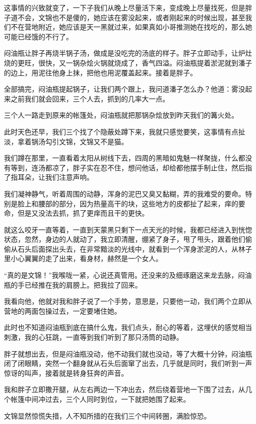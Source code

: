 这事情的兴致就变了，一下子我们从晚上尽量活下来，变成晚上尽量找死，但是胖子道不会，文锦也不是傻的，她应该在雾没起来，或者刚起来的时候出现，甚至我们不在营地附近，她应该是天一黑就过来，如果真如小哥推测她在找吃的，那么她可能已经饿的不行了。

闷油瓶让胖子再烧半锅子汤，做成是没吃完的汤底的样子。胖子立即动手，让炉灶烧的更旺，很快，又一锅杂烩火锅就烧成了，香气四溢。闷油瓶提着淤泥就到潘子的边上，用泥往他身上抹，把他也用泥覆盖起来。接着是胖子。

全部搞完，闷油瓶提起锅子，让我们两个跟上，我问道潘子怎么办？他道：雾没起来之前我们就会回来，三个人去，抓到的几率大一点。

三个人一路走到原来的帐篷处，闷油瓶就把那锅杂烩放到昨天我们的篝火处。

此时天色还早，我们三个找了个隐蔽处蹲下来，我就只感觉要笑，这事情有点扯淡，拿着锅汤勾引文锦，文锦又不是猫。

我们蹲在那里，一直看着太阳从树线下去，四周的黑暗如鬼魅一样聚拢，什么都没有等到，连汤都凉了，胖子实在忍不住，想问他话，却给都他摆手制止住，然后指了指耳朵，让我们注意声响。

我们凝神静气，听着周围的动静，浑身的泥巴又臭又黏糊，弄的我难受的要命。特别是脸上和腰部的部分，因为热量高干的块，这些地方的皮都扯了起来，痒的要命，但是又没法去抓，抓了更痒而且干的更快。

就这么咬牙一直等着，一直到天蒙黑只剩下一点天光的时候，我都已经进入到恍惚状态，忽然，身边的人就动了，我立即清醒，绷紧了身子，甩了甩头，跟着他们偷偷从石头后面探出头去，在非常黯淡的光线中，就看到一个浑身淤泥的人，从林子里小心翼翼的走了出来，看身材，赫然是一个女人。

“真的是文锦！”我喉咙一紧，心说还真管用。还没来的及细琢磨这来龙去脉，闷油瓶的手已经推在我的肩膀上。把我拉了回来。

我看向他，他就对我和胖子说了一个手势，意思是，只要他一动，我们两个立即从营地的两面包操过去，一定要堵住她。

此时也不知道闷油瓶到底在搞什么鬼，我们点头，耐心的等着，这埋伏的感觉相当刺激，我的心狂跳，一直等到我们听到了那只汤筒的动静。

胖子就想出去，但是闷油瓶没动，他不动我们就也没动，等了大概十分钟，闷油瓶闭了闭眼睛，突然一个翻身就从石头后面窜了出去，几乎就是同时，我们听到一声惊讶的叫声，接着就是转身狂奔的声音。

我和胖子立即撒开腿，从左右两边一下冲出去，然后绕着营地一下围了过去，从几个帐篷中间冲过去，三个人同时到位，一下就把她围了起来。

文锦显然惊慌失措，人不知所措的在我们三个中间转圈，满脸惊恐。

